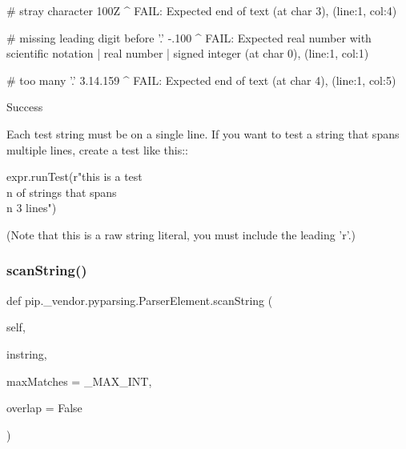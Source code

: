 \begin{DoxyVerb}
    # stray character
    100Z
       ^
    FAIL: Expected end of text (at char 3), (line:1, col:4)

    # missing leading digit before '.'
    -.100
    ^
    FAIL: Expected {real number with scientific notation | real number | signed integer} (at char 0), (line:1, col:1)

    # too many '.'
    3.14.159
^
    FAIL: Expected end of text (at char 4), (line:1, col:5)

    Success

Each test string must be on a single line. If you want to test a string that spans multiple
lines, create a test like this::

    expr.runTest(r"this is a test\\n of strings that spans \\n 3 lines")

(Note that this is a raw string literal, you must include the leading 'r'.)
\end{DoxyVerb}
 \mbox{\label{classpip_1_1__vendor_1_1pyparsing_1_1ParserElement_aa5daff52b40d5b79a6402005f48e942f}} 
\subsubsection{\texorpdfstring{scan\+String()}{scanString()}}
{\footnotesize\ttfamily def pip.\+\_\+vendor.\+pyparsing.\+Parser\+Element.\+scan\+String (\begin{DoxyParamCaption}\item[{}]{self,  }\item[{}]{instring,  }\item[{}]{max\+Matches = {\ttfamily \+\_\+MAX\+\_\+INT},  }\item[{}]{overlap = {\ttfamily False} }\end{DoxyParamCaption})}

